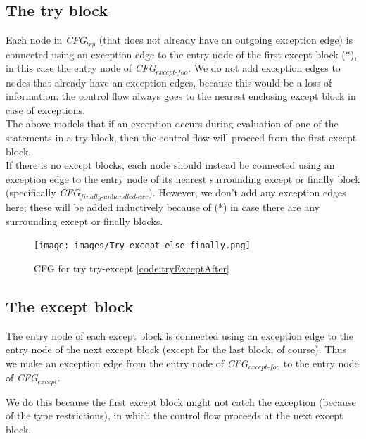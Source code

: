 \subsection{The try block}
Each node in \textit{CFG$_{\textit{try}}$} (that does not already have an outgoing exception edge) is connected using an exception edge to the entry node of the first except block (*), in this case the entry node of \textit{CFG$_{\textit{except-foo}}$}. We do not add exception edges to nodes that already have an exception edges, because this would be a loss of information: the control flow always goes to the nearest enclosing except block in case of exceptions. \\
The above models that if an exception occurs during evaluation of one of the statements in a try block, then the control flow will proceed from the first except block. \\
If there is no except blocks, each node should instead be connected using an exception edge to the entry node of its nearest surrounding except or finally block (specifically \textit{CFG$_{\textit{finally-unhandled-exc}}$}). However, we don't add any exception edges here; these will be added inductively because of (*) in case there are any surrounding except or finally blocks.

\begin{figure}
  \vspace{-20pt}
  \begin{center}
    \texttt{[image: images/Try-except-else-finally.png]}
  \end{center}
  \vspace{-10pt}
  \caption{CFG for try try-except \autoref{code:tryExceptAfter}}
  \label{fig:tryExceptCfg}
  \vspace{-10pt}
\end{figure}



\subsection{The except block}
The entry node of each except block is connected using an exception edge to the entry node of the next except block (except for the last block, of course). 
Thus we make an exception edge from the entry node of \textit{CFG$_{\textit{except-foo}}$} to the entry node of \textit{CFG$_{\textit{except}}$}.

We do this because the first except block might not catch the exception (because of the type restrictions), 
in which the control flow proceeds at the next except block.

